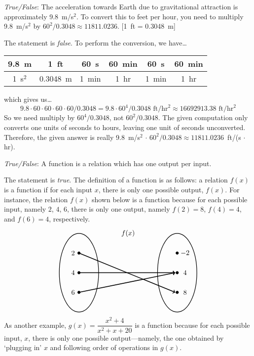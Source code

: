 \documentclass[11pt,letterpaper]{article}
\begin{document}
\quizsol \textit{True/False}: The acceleration towards Earth due to gravitational attraction is approximately 9.8~m/s$^2$. To convert this to feet per hour, you need to multiply 9.8~m/s$^2$ by $60^2/0.3048 \approx 11811.0236$. [1~ft = 0.3048~m] \pspace

\sol The statement is \textit{false}. To perform the conversion, we have\dots \par
	\begin{table}[!ht]
	\centering
	\hspace{-1cm}
	\begin{tabular}{c|c|c|c|c|c}
	9.8~m	& 1~ft		& 60~s   & 60~min & 60~s    & 60~min \\ \hline
	1~s$^2$	& 0.3048~m	& 1~min & 1~hr      & 1~min &  1~hr
	\end{tabular}
	\end{table} \par
which gives us\dots
	\[
	9.8 \cdot 60 \cdot 60 \cdot 60 \cdot 60/0.3048= 9.8 \cdot 60^4/0.3048 \text{ ft}/\text{hr}^2 \approx 16692913.38 \text{ ft}/\text{hr}^2
	\]
So we need multiply by $60^4/0.3048$, not $60^2/0.3048$. The given computation only converts one units of seconds to hours, leaving one unit of seconds unconverted. Therefore, the given answer is really 9.8~m/s$^2$ $\cdot$ $60^2/0.3048 \approx 11811.0236$~ft/(s $\cdot$ hr). \pvspace{1.4cm}



\quizsol \textit{True/False}: A function is a relation which has one output per input. \pspace

\sol The statement is \textit{true}. The definition of a function is as follows: a relation $f(x)$ is a function if for each input $x$, there is only one possible output, $f(x)$. For instance, the relation $f(x)$ shown below is a function because for each possible input, namely $2$, $4$, $6$, there is only one output, namely $f(2)= 8$, $f(4)= 4$, and $f(6)= 4$, respectively. 
	\[
	\begin{tikzpicture}
	\node at (2.5,2) {$f(x)$};
	\draw[line width=0.03cm] (0,0) circle (1 and 2);
	\draw[line width=0.03cm] (5,0) circle (1 and 2);
	
	\draw[fill=black] (0,1) circle (0.07);
	\draw[fill=black] (0,0) circle (0.07);
	\draw[fill=black] (0,-1) circle (0.07);
	
	\draw[fill=black] (5,1) circle (0.07);
	\draw[fill=black] (5,0) circle (0.07);
	\draw[fill=black] (5,-1) circle (0.07);
	
	\draw[line width=0.04cm,->] (0,1) -- (4.9,-1);
	\draw[line width=0.04cm,->] (0,0) -- (4.9,0);
	\draw[line width=0.04cm,->] (0,-1) -- (4.9,0);
	
	\node at (-0.3,1) {$2$};
	\node at (-0.3,0) {$4$};
	\node at (-0.3,-1) {$6$};
	
	\node at (5.4,1) {$-2$};
	\node at (5.4,0) {$4$};
	\node at (5.4,-1) {$8$};
	\end{tikzpicture}
	\]
As another example, $g(x)= \dfrac{x^2 + 4}{x^2 + x + 20}$ is a function because for each possible input, $x$, there is only one possible output---namely, the one obtained by `plugging in' $x$ and following order of operations in $g(x)$. \pvspace{1.4cm}
\end{document}
